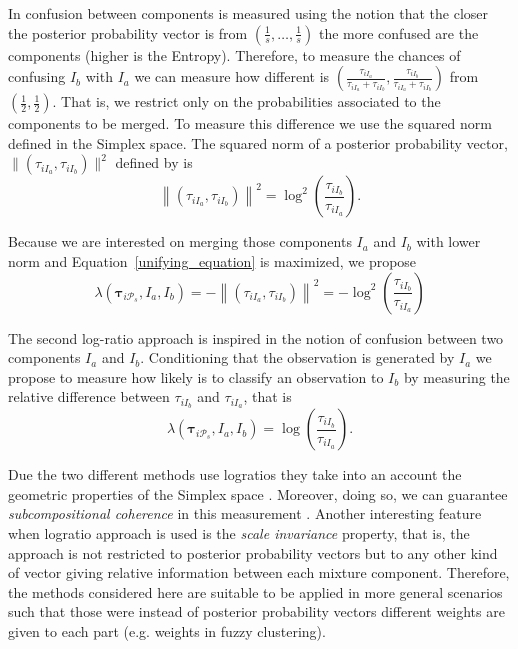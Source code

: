 \documentclass[10pt, a4paper]{article}
\newcommand{\m}[1]{\boldsymbol{#1}}
\begin{document}
\begin{spacing}{1.9}
In \cite{baudry2010combining} confusion between components is measured using the notion that the closer the posterior probability vector is from $(\frac{1}{s}, \dots, \frac{1}{s})$ the more confused are the components (higher is the Entropy). Therefore, to measure the chances of confusing $I_b$ with $I_a$ we can measure how different is $(\frac{\tau_{i I_a}}{\tau_{i I_a} +\tau_{i I_b}}, \frac{\tau_{i I_b}}{\tau_{i I_a} + \tau_{i I_b}})$ from $(\frac{1}{2}, \frac{1}{2})$. That is, we restrict only on the probabilities associated to the components to be merged. To measure this difference we use the squared norm defined in the Simplex space. The squared norm of a posterior probability vector, $\| (\tau_{iI_a}, \tau_{iI_b}) \|^2$  defined by \cite{aitchison2002simplicial} is 
\[
\left\| (\tau_{iI_a}, \tau_{iI_b}) \right\|^2 = \log^2 \left(\frac{ \tau_{iI_b} }{ \tau_{iI_a} }\right).
\]

Because we are interested on merging those components $I_a$ and $I_b$ with lower norm and Equation~\ref{unifying_equation} is maximized, we propose
\[
\lambda(\m\tau_{i \mathcal{P}_s},  I_a,  I_b) = -\left\| (\tau_{iI_a}, \tau_{iI_b}) \right\|^2 = -\log^2 \left(\frac{ \tau_{iI_b} }{ \tau_{iI_a} }\right)
\]


The second log-ratio approach is inspired in the notion of confusion \citep{hennig2010methods} between two components $I_a$ and $I_b$. Conditioning that the observation is generated by $I_a$ we propose to measure how likely is to classify an observation to $I_b$ by measuring the relative difference between $\tau_{i I_b}$ and $\tau_{i I_a}$, that is 
\[
\lambda(\m\tau_{i \mathcal{P}_s},  I_a,  I_b) = \log \left(\frac{ \tau_{iI_b} }{ \tau_{iI_a} }\right).
\]


Due the two different methods use logratios they take into an account the geometric properties of the Simplex space \citep{aitchison2002simplicial}.  Moreover, doing so, we can guarantee \emph{subcompositional coherence} in this measurement \citep{aitchison1986statistical}. Another interesting feature when logratio approach is used is the \emph{scale invariance} property, that is, the approach is not restricted to posterior probability vectors but to any other kind of vector giving relative information between each mixture component. Therefore, the methods considered here are suitable to be applied in more general scenarios such that those were instead of posterior probability vectors different weights are given to each part (e.g. weights in fuzzy clustering).


\end{spacing}
\end{document}
